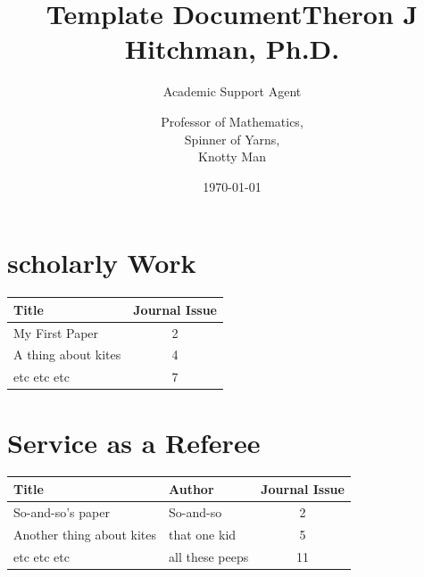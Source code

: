 \documentclass{article}
\title{Template Document}
\author{Academic Support Agent}
\date{\today}
\begin{document}
\maketitle

\title{Theron J Hitchman, Ph.D.}
\author{Professor of Mathematics,\\ Spinner of Yarns,\\ Knotty Man}

\maketitle

\begin{center}

\section*{scholarly Work}

\begin{tabular}{l|c}
Title & Journal Issue \\
\hline
\hline
My First Paper & 2 \\
A thing about kites & 4 \\
etc etc etc & 7  
\end{tabular}

\vspace{1in}

\section*{Service as a Referee}

\begin{tabular}{l|l|c}
Title &  Author & Journal Issue \\
\hline
\hline
So-and-so's paper & So-and-so & 2 \\
Another thing about kites & that one kid & 5 \\
etc etc etc & all these peeps & 11  
\end{tabular}

\end{center}
\end{document}
